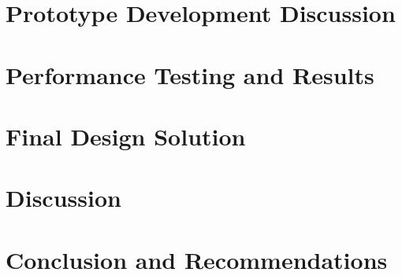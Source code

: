 \documentclass{article}
\begin{document}
\section{Prototype Development Discussion}
\label{sec:prot-devel-disc}

\section{Performance Testing and Results}
\label{sec:perf-test-results}

\section{Final Design Solution}
\label{sec:final-design-solut}

\section{Discussion}
\label{sec:discussion}

\section{Conclusion and Recommendations}
\label{sec:concl-recomm}

\newpage
{}


\end{document}
